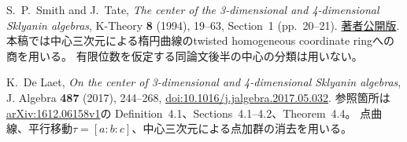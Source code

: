 S.~P.~Smith and J.~Tate,
\emph{The center of the 3-dimensional and 4-dimensional Sklyanin algebras},
K-Theory \textbf{8} (1994), 19--63, Section~1 (pp.~20--21).
\href{https://sites.math.washington.edu/~smith/Research/tate.pdf}{著者公開版}.
本稿では中心三次元による楕円曲線のtwisted homogeneous coordinate ringへの商を用いる。
有限位数を仮定する同論文後半の中心の分類は用いない。

K.~De Laet,
\emph{On the center of 3-dimensional and 4-dimensional Sklyanin algebras},
J. Algebra \textbf{487} (2017), 244--268,
\href{https://doi.org/10.1016/j.jalgebra.2017.05.032}{doi:10.1016/j.jalgebra.2017.05.032}.
参照箇所は\href{https://arxiv.org/abs/1612.06158}{arXiv:1612.06158v1}の
Definition~4.1、Sections~4.1--4.2、Theorem~4.4。
点曲線、平行移動$\tau=[a:b:c]$、中心三次元による点加群の消去を用いる。
